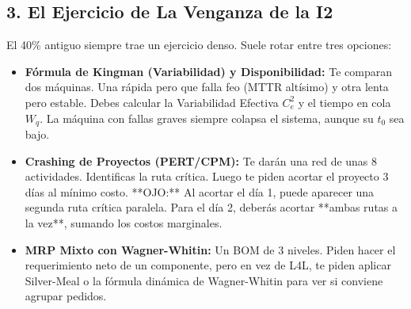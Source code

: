 \subsection{3. El Ejercicio de La Venganza de la I2}
El 40\% antiguo siempre trae un ejercicio denso. Suele rotar entre tres opciones:
\begin{itemize}
    \item \textbf{Fórmula de Kingman (Variabilidad) y Disponibilidad:} Te comparan dos máquinas. Una rápida pero que falla feo (MTTR altísimo) y otra lenta pero estable. Debes calcular la Variabilidad Efectiva $C_e^2$ y el tiempo en cola $W_q$. La máquina con fallas graves siempre colapsa el sistema, aunque su $t_0$ sea bajo.
    \item \textbf{Crashing de Proyectos (PERT/CPM):} Te darán una red de unas 8 actividades. Identificas la ruta crítica. Luego te piden acortar el proyecto 3 días al mínimo costo. **OJO:** Al acortar el día 1, puede aparecer una segunda ruta crítica paralela. Para el día 2, deberás acortar **ambas rutas a la vez**, sumando los costos marginales.
    \item \textbf{MRP Mixto con Wagner-Whitin:} Un BOM de 3 niveles. Piden hacer el requerimiento neto de un componente, pero en vez de L4L, te piden aplicar Silver-Meal o la fórmula dinámica de Wagner-Whitin para ver si conviene agrupar pedidos.
\end{itemize}
